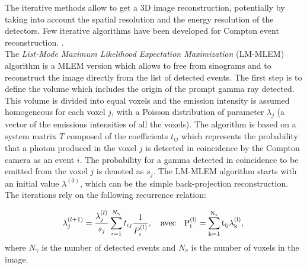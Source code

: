 The iterative methods allow to get a 3D image reconstruction, potentially by taking into account the spatial resolution and the energy resolution of the detectors. Few iterative algorithms have been developed for Compton event reconstruction. \cite{schone_common_2010, zoglauer_design_2011,gillam_compton_2011,mackin_evaluation_2012,lojacono_low_2013}.\\
The \textit{List-Mode Maximum Likelihood Expectation Maximization} (LM-MLEM) algorithm is a MLEM version which allows to free from sinograms and to reconstruct the image directly from the list of detected events.
The first step is to define the volume which includes the origin of the prompt gamma ray detected. This volume is divided into equal voxels and the emission intensity is assumed homogeneous for each voxel $j$, with a Poisson distribution of parameter $\lambda_j$ (a vector of the emissions intensities of all the voxels). The algorithm is based on a system matrix $T$ composed of the coefficients  $t_{ij}$ which represents the probability that a photon produced in the voxel $j$ is detected in coincidence by the Compton camera as an event $i$. The probability for a gamma detected in coincidence to be emitted from the voxel $j$ is denoted as $s_j$.
The LM-MLEM algorithm starts with an initial value $\lambda^{(0)}$, which can be the simple back-projection reconstruction.
The iterations rely on the following recurrence relation:

\begin{equation}
\lambda_j^{(l+1)} =  \frac{\lambda_j^{(l)} }{s_j} \sum\limits_{i=1}^{N_{\gamma}} t_{ij} \frac{1}{P_i^{(l)}},\quad \rm{avec}\quad  P_i^{(l)}=\sum\limits_{k=1}^{N_{v}} t_{ij}\lambda_k^{(l)},
 \label{eq:equation_lambda_compton_med_nucleaire}\newline
\end{equation}
where $N_{\gamma}$ is the number of detected events and $N_v$ is the number of voxels in the image.\newline

